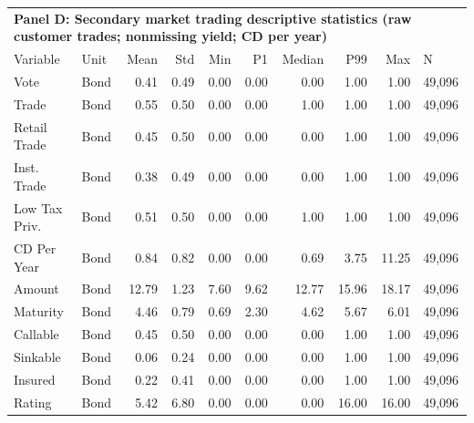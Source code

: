 \begin{table}[H]
\centering
\begin{tabular*}{\textwidth}{@{\extracolsep{\fill}}llrrrrrrrl}
\multicolumn{10}{l}{\textbf{Panel D: Secondary market trading descriptive statistics (raw customer trades; nonmissing yield; CD per year)}}\\

\addlinespace
  \toprule
Variable & Unit & Mean & Std & Min & P1 & Median & P99 & Max & N \\ 
  \hline
Vote & Bond & 0.41 & 0.49 & 0.00 & 0.00 & 0.00 & 1.00 & 1.00 & 49,096 \\ 
  Trade & Bond & 0.55 & 0.50 & 0.00 & 0.00 & 1.00 & 1.00 & 1.00 & 49,096 \\ 
  Retail Trade & Bond & 0.45 & 0.50 & 0.00 & 0.00 & 0.00 & 1.00 & 1.00 & 49,096 \\ 
  Inst. Trade & Bond & 0.38 & 0.49 & 0.00 & 0.00 & 0.00 & 1.00 & 1.00 & 49,096 \\ 
  Low Tax Priv. & Bond & 0.51 & 0.50 & 0.00 & 0.00 & 1.00 & 1.00 & 1.00 & 49,096 \\ 
  CD Per Year & Bond & 0.84 & 0.82 & 0.00 & 0.00 & 0.69 & 3.75 & 11.25 & 49,096 \\ 
  Amount & Bond & 12.79 & 1.23 & 7.60 & 9.62 & 12.77 & 15.96 & 18.17 & 49,096 \\ 
  Maturity & Bond & 4.46 & 0.79 & 0.69 & 2.30 & 4.62 & 5.67 & 6.01 & 49,096 \\ 
  Callable & Bond & 0.45 & 0.50 & 0.00 & 0.00 & 0.00 & 1.00 & 1.00 & 49,096 \\ 
  Sinkable & Bond & 0.06 & 0.24 & 0.00 & 0.00 & 0.00 & 1.00 & 1.00 & 49,096 \\ 
  Insured & Bond & 0.22 & 0.41 & 0.00 & 0.00 & 0.00 & 1.00 & 1.00 & 49,096 \\ 
  Rating & Bond & 5.42 & 6.80 & 0.00 & 0.00 & 0.00 & 16.00 & 16.00 & 49,096 \\ 
   \hline
\end{tabular*}
\end{table}
